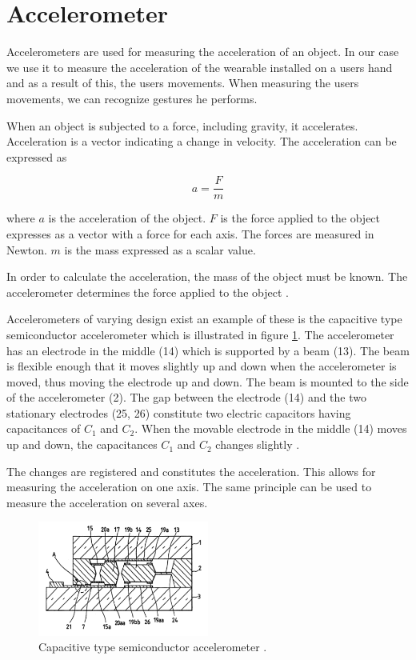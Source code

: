 \section{Accelerometer}

Accelerometers are used for measuring the acceleration of an object. In our case we use it to measure the acceleration of the wearable installed on a users hand and as a result of this, the users movements. When measuring the users movements, we can recognize gestures he performs.

When an object is subjected to a force, including gravity, it accelerates. Acceleration is a vector indicating a change in velocity. The acceleration can be expressed as

\begin{equation*}
a = \frac{F}{m}
\end{equation*}

where $a$ is the acceleration of the object. $F$ is the force applied to the object expresses as a vector with a force for each axis. The forces are measured in Newton. $m$ is the mass expressed as a scalar value.

In order to calculate the acceleration, the mass of the object must be known. The accelerometer determines the force applied to the object \cite[pp. 392-393]{Fraden:2112745}.

Accelerometers of varying design exist \cite[pp. 392-411]{Fraden:2112745} an example of these is the capacitive type semiconductor accelerometer which is illustrated in figure \ref{fig:accelerometer}. The accelerometer has an electrode in the middle (14) which is supported by a beam (13). The beam is flexible enough that it moves slightly up and down when the accelerometer is moved, thus moving the electrode up and down. The beam is mounted to the side of the accelerometer (2). The gap between the electrode (14) and the two stationary electrodes (25, 26) constitute two electric capacitors having capacitances of $C_1$ and $C_2$.
When the movable electrode in the middle (14) moves up and down, the capacitances $C_1$ and $C_2$ changes slightly \cite{kloeck1993capacitive}.

The changes are registered and constitutes the acceleration. This allows for measuring the acceleration on one axis. The same principle can be used to measure the acceleration on several axes.

\begin{figure}
\centering
\includegraphics[width=0.5\textwidth]{images/accelerometer}
\caption{Capacitive type semiconductor accelerometer \cite{kloeck1993capacitive}.}
\label{fig:accelerometer}
\end{figure}


